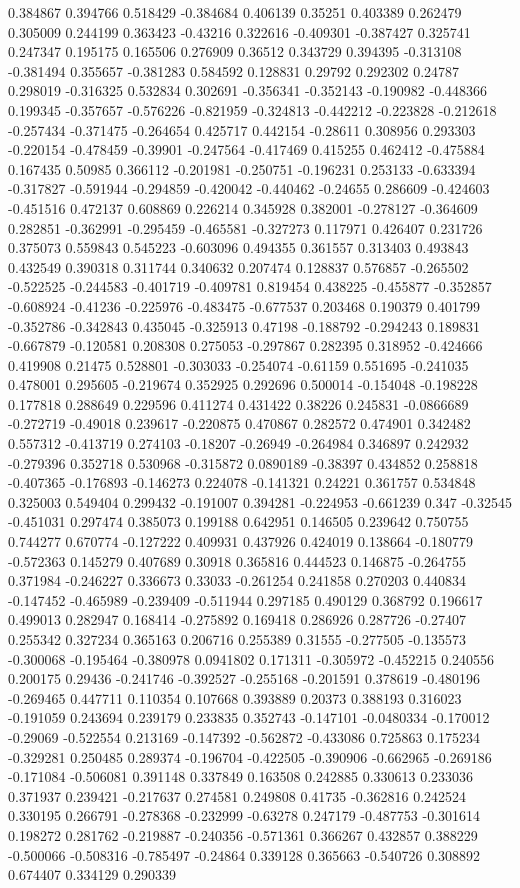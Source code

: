 0.384867 0.394766 0.518429 -0.384684 0.406139 0.35251 0.403389 0.262479 0.305009 0.244199 0.363423 -0.43216 0.322616 -0.409301 -0.387427 0.325741 0.247347 0.195175 0.165506 0.276909 0.36512 0.343729 0.394395 -0.313108 -0.381494 0.355657 -0.381283 0.584592 0.128831 0.29792 0.292302 0.24787 0.298019 -0.316325 0.532834 0.302691 -0.356341 -0.352143 -0.190982 -0.448366 0.199345 -0.357657 -0.576226 -0.821959 -0.324813 -0.442212 -0.223828 -0.212618 -0.257434 -0.371475 -0.264654 0.425717 0.442154 -0.28611 0.308956 0.293303 -0.220154 -0.478459 -0.39901 -0.247564 -0.417469 0.415255 0.462412 -0.475884 0.167435 0.50985 0.366112 -0.201981 -0.250751 -0.196231 0.253133 -0.633394 -0.317827 -0.591944 -0.294859 -0.420042 -0.440462 -0.24655 0.286609 -0.424603 -0.451516 0.472137 0.608869 0.226214 0.345928 0.382001 -0.278127 -0.364609 0.282851 -0.362991 -0.295459 -0.465581 -0.327273 0.117971 0.426407 0.231726 0.375073 0.559843 0.545223 -0.603096 0.494355 0.361557 0.313403 0.493843 0.432549 0.390318 0.311744 0.340632 0.207474 0.128837 0.576857 -0.265502 -0.522525 -0.244583 -0.401719 -0.409781 0.819454 0.438225 -0.455877 -0.352857 -0.608924 -0.41236 -0.225976 -0.483475 -0.677537 0.203468 0.190379 0.401799 -0.352786 -0.342843 0.435045 -0.325913 0.47198 -0.188792 -0.294243 0.189831 -0.667879 -0.120581 0.208308 0.275053 -0.297867 0.282395 0.318952 -0.424666 0.419908 0.21475 0.528801 -0.303033 -0.254074 -0.61159 0.551695 -0.241035 0.478001 0.295605 -0.219674 0.352925 0.292696 0.500014 -0.154048 -0.198228 0.177818 0.288649 0.229596 0.411274 0.431422 0.38226 0.245831 -0.0866689 -0.272719 -0.49018 0.239617 -0.220875 0.470867 0.282572 0.474901 0.342482 0.557312 -0.413719 0.274103 -0.18207 -0.26949 -0.264984 0.346897 0.242932 -0.279396 0.352718 0.530968 -0.315872 0.0890189 -0.38397 0.434852 0.258818 -0.407365 -0.176893 -0.146273 0.224078 -0.141321 0.24221 0.361757 0.534848 0.325003 0.549404 0.299432 -0.191007 0.394281 -0.224953 -0.661239 0.347 -0.32545 -0.451031 0.297474 0.385073 0.199188 0.642951 0.146505 0.239642 0.750755 0.744277 0.670774 -0.127222 0.409931 0.437926 0.424019 0.138664 -0.180779 -0.572363 0.145279 0.407689 0.30918 0.365816 0.444523 0.146875 -0.264755 0.371984 -0.246227 0.336673 0.33033 -0.261254 0.241858 0.270203 0.440834 -0.147452 -0.465989 -0.239409 -0.511944 0.297185 0.490129 0.368792 0.196617 0.499013 0.282947 0.168414 -0.275892 0.169418 0.286926 0.287726 -0.27407 0.255342 0.327234 0.365163 0.206716 0.255389 0.31555 -0.277505 -0.135573 -0.300068 -0.195464 -0.380978 0.0941802 0.171311 -0.305972 -0.452215 0.240556 0.200175 0.29436 -0.241746 -0.392527 -0.255168 -0.201591 0.378619 -0.480196 -0.269465 0.447711 0.110354 0.107668 0.393889 0.20373 0.388193 0.316023 -0.191059 0.243694 0.239179 0.233835 0.352743 -0.147101 -0.0480334 -0.170012 -0.29069 -0.522554 0.213169 -0.147392 -0.562872 -0.433086 0.725863 0.175234 -0.329281 0.250485 0.289374 -0.196704 -0.422505 -0.390906 -0.662965 -0.269186 -0.171084 -0.506081 0.391148 0.337849 0.163508 0.242885 0.330613 0.233036 0.371937 0.239421 -0.217637 0.274581 0.249808 0.41735 -0.362816 0.242524 0.330195 0.266791 -0.278368 -0.232999 -0.63278 0.247179 -0.487753 -0.301614 0.198272 0.281762 -0.219887 -0.240356 -0.571361 0.366267 0.432857 0.388229 -0.500066 -0.508316 -0.785497 -0.24864 0.339128 0.365663 -0.540726 0.308892 0.674407 0.334129 0.290339 